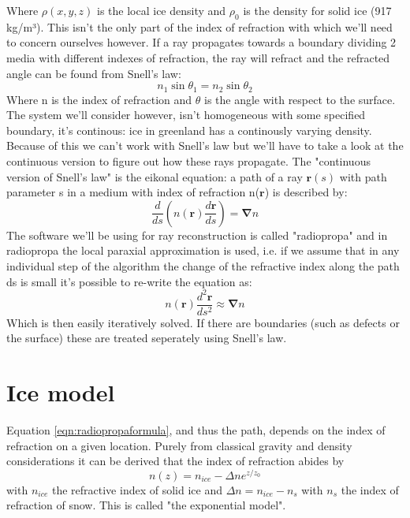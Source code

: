 \documentclass[11pt,a4paper,faculty=we,language=en,doctype=report]{cls/ugent-doc}
\begin{document}
Where $\rho(x,y,z)$ is the local ice density and $\rho_0$ is the
density for solid ice (917 kg/m³).
This isn't the only part of the index of refraction with which we'll
need to concern ourselves however. If a ray propagates towards a
boundary dividing 2 media with different indexes of refraction, the
ray will refract and the refracted angle can be
found from Snell's law:
\begin{equation}
	n_1\sin{\theta_1} = n_2\sin{\theta_2}
\end{equation}
Where n is the index of refraction and $\theta$ is the angle
with respect to the surface.
The system we'll consider however, isn't 
homogeneous with some specified boundary, it's continous: ice
in greenland has a continously varying density. 
Because of this we can't work with Snell's law but we'll have to 
take a look at the continuous version
to figure out how these rays propagate. 
The "continuous version of Snell's law" is the eikonal equation:
a path of a ray $\mathbf{r}(s)$ with path parameter s in a medium
with index of refraction n($\mathbf{r}$) is described by:
\begin{equation}
	\frac{d}{ds}\left(n(\mathbf{r})\frac{d\mathbf{r}}{ds}\right) = \mathbf{\nabla} n
\end{equation}
The software we'll be using for ray reconstruction is called
"radiopropa" \cite{Winchen_2019} and in radiopropa the
local paraxial approximation is used, i.e. if we assume that in any
individual step of the algorithm the change of the refractive index
along the path ds is small it's possible to
re-write the equation as:
\begin{equation}
	n(\mathbf{r})\frac{d^2\mathbf{r}}{ds^2} \approx \mathbf{\nabla} n
	\label{eqn:radiopropaformula}
\end{equation}
Which is then easily iteratively solved.
If there are boundaries (such as defects or the surface)
these are treated seperately using Snell's law. 
\section{Ice model}
\label{section:Ice Model}
Equation \ref{eqn:radiopropaformula}, and thus the path, depends 
on the index of refraction on a given location. 
Purely from classical gravity and density considerations
it can be derived that the index of refraction abides by
\begin{equation}
	n(z) = n_{ice} - \Delta n e^{z/z_0}
\end{equation}
with $n_{ice}$ the refractive index of solid ice and $\Delta n =
n_{ice} - n_s$ with $n_s$ the index of refraction of snow. This is
called
"the exponential model".
\end{document}
